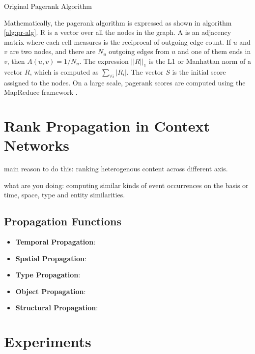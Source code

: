 \SetAlgoSkip{}
\begin{algorithm}[h!]
\dontprintsemicolon 
{}
\caption{Original Pagerank Algorithm}
\label{alg:pr-alg}
\end{algorithm}

Mathematically, the pagerank algorithm is expressed as shown in algorithm \ref{alg:pr-alg}. R is a vector over all the nodes in the graph. A is an adjacency matrix where each cell measures is the reciprocal of outgoing edge count. If $u$ and $v$ are two nodes, and there are $N_u$ outgoing edges from $u$ and one of them ends in $v$, then $A(u, v) = 1/N_u$. The expression $||R||_1$ is the L1 or Manhattan norm of a vector $R$, which is computed as $\sum_{\forall i} |R_i|$. The vector $S$ is the initial score assigned to the nodes. On a large scale, pagerank scores are computed using the MapReduce framework \cite{dean2008mapreduce}.

\section{Rank Propagation in Context Networks}

main reason to do this: ranking heterogenous content across different axis.

what are you doing: computing similar kinds of event occurrences on the basis or time, space, type and entity similarities.

\subsection{Propagation Functions}

\begin{itemize}
\item \textbf{Temporal Propagation}:
\item \textbf{Spatial Propagation}:
\item \textbf{Type Propagation}:
\item \textbf{Object Propagation}:
\item \textbf{Structural Propagation}:
\end{itemize}

\section{Experiments}
